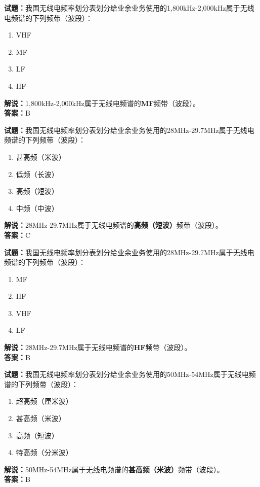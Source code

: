 \documentclass{ctexbook}
\begin{document}
\vspace{1em}

\textbf{试题：}我国无线电频率划分表划分给业余业务使用的1,800\unit{\kHz}-2,000\unit{\kHz}属于无线电频谱的下列频带（波段）：
\begin{enumerate}[leftmargin=3em]
  \item VHF
  \item MF
  \item LF
  \item HF
\end{enumerate}
\noindent\textbf{解说：}1,800\unit{\kHz}-2,000\unit{\kHz}属于无线电频谱的\textbf{MF}频带（波段）。\\\noindent\textbf{答案：}B

\vspace{1em}

\textbf{试题：}我国无线电频率划分表划分给业余业务使用的28\unit{\MHz}-29.7\unit{\MHz}属于无线电频谱的下列频带（波段）：
\begin{enumerate}[leftmargin=3em]
  \item 甚高频（米波）
  \item 低频（长波）
  \item 高频（短波）
  \item 中频（中波）
\end{enumerate}
\noindent\textbf{解说：}28\unit{\MHz}-29.7\unit{\MHz}属于无线电频谱的\textbf{高频（短波）}频带（波段）。\\\noindent\textbf{答案：}C

\vspace{1em}

\textbf{试题：}我国无线电频率划分表划分给业余业务使用的28\unit{\MHz}-29.7\unit{\MHz}属于无线电频谱的下列频带（波段）：
\begin{enumerate}[leftmargin=3em]
  \item MF
  \item HF
  \item VHF
  \item LF
\end{enumerate}
\noindent\textbf{解说：}28\unit{\MHz}-29.7\unit{\MHz}属于无线电频谱的\textbf{HF}频带（波段）。\\\noindent\textbf{答案：}B

\vspace{1em}

\textbf{试题：}我国无线电频率划分表划分给业余业务使用的50\unit{\MHz}-54\unit{\MHz}属于无线电频谱的下列频带（波段）：
\begin{enumerate}[leftmargin=3em]
  \item 超高频（厘米波）
  \item 甚高频（米波）
  \item 高频（短波）
  \item 特高频（分米波）
\end{enumerate}
\noindent\textbf{解说：}50\unit{\MHz}-54\unit{\MHz}属于无线电频谱的\textbf{甚高频（米波）}频带（波段）。\\\noindent\textbf{答案：}B
\end{document}
